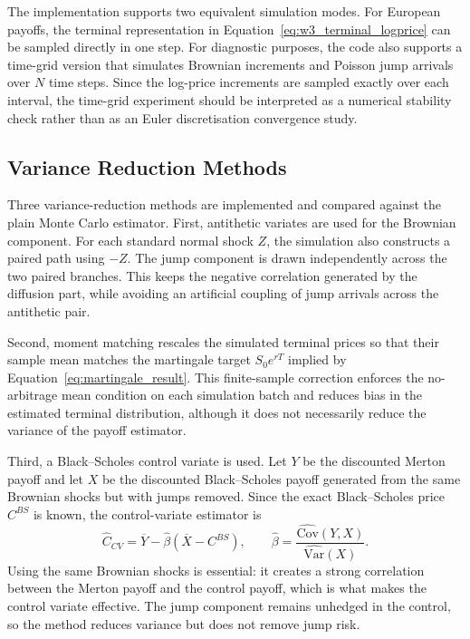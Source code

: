 \documentclass[12pt]{article}
\begin{document}
The implementation supports two equivalent simulation modes. For European payoffs, the terminal representation in Equation~\eqref{eq:w3_terminal_logprice} can be sampled directly in one step. For diagnostic purposes, the code also supports a time-grid version that simulates Brownian increments and Poisson jump arrivals over $N$ time steps. Since the log-price increments are sampled exactly over each interval, the time-grid experiment should be interpreted as a numerical stability check rather than as an Euler discretisation convergence study.

\subsection*{Variance Reduction Methods}

Three variance-reduction methods are implemented and compared against the plain Monte Carlo estimator. First, antithetic variates are used for the Brownian component. For each standard normal shock $Z$, the simulation also constructs a paired path using $-Z$. The jump component is drawn independently across the two paired branches. This keeps the negative correlation generated by the diffusion part, while avoiding an artificial coupling of jump arrivals across the antithetic pair.

Second, moment matching rescales the simulated terminal prices so that their sample mean matches the martingale target $S_0e^{rT}$ implied by Equation~\eqref{eq:martingale_result}. This finite-sample correction enforces the no-arbitrage mean condition on each simulation batch and reduces bias in the estimated terminal distribution, although it does not necessarily reduce the variance of the payoff estimator.

Third, a Black--Scholes control variate is used. Let $Y$ be the discounted Merton payoff and let $X$ be the discounted Black--Scholes payoff generated from the same Brownian shocks but with jumps removed. Since the exact Black--Scholes price $C^{BS}$ is known, the control-variate estimator is
\begin{equation}
\widehat{C}_{CV}=\overline{Y}-\widehat{\beta}(\overline{X}-C^{BS}),
\qquad
\widehat{\beta}=\frac{\widehat{\mathrm{Cov}}(Y,X)}{\widehat{\mathrm{Var}}(X)}.
\label{eq:w3_control_variate}
\end{equation}
Using the same Brownian shocks is essential: it creates a strong correlation between the Merton payoff and the control payoff, which is what makes the control variate effective. The jump component remains unhedged in the control, so the method reduces variance but does not remove jump risk.
\end{document}
